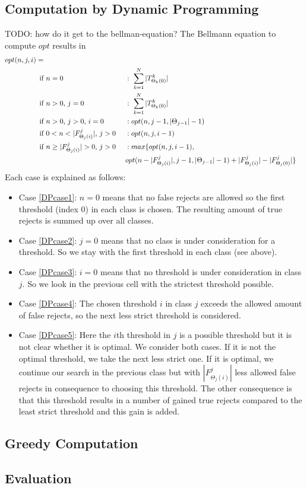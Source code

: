 \subsection{Computation by Dynamic Programming}
TODO: how do it get to the bellman-equation?
The Bellmann equation to compute $opt$ results in
\begin{align}
opt(n,j,i) = \notag \\
\text{if}& \ n=0 \ &&: \ \sum_{k=1}^{N} |T_{\Theta_k(0)}^k| \label{DPcase1}\\
\text{if}& \ n>0\text{,}\ j=0 \ &&: \ \sum_{k=1}^{N} |T_{\Theta_k(0)}^k| \label{DPcase2}\\
\text{if}& \ n>0\text{,}\ j>0\text{,}\ i=0 \ &&: opt(n,j-1,|\Theta_{j-1}|-1) \label{DPcase3}\\
\text{if}& \ 0<n<|F_{\Theta_j(i)}^j|\text{,}\ j>0 \ &&: opt(n,j,i-1) \label{DPcase4}\\
\text{if}& \ n \geq |F_{\Theta_j(i)}^j|>0\text{,}\ j>0 \ &&: max\{opt(n,j,i-1), \notag \\
& && opt(n-|F_{\Theta_j(i)}^j|,j-1,|\Theta_{j-1}|-1)+|F_{\Theta_j(i)}^j|-|F_{\Theta_j(0)}^j|\} \label{DPcase5}
\end{align}
Each case is explained as follows:
\begin{itemize}
\item Case \ref{DPcase1}: $n=0$ means that no false rejects are allowed so the first threshold (index 0) in each class is chosen. The resulting amount of true rejects is summed up over all classes.
\item Case \ref{DPcase2}: $j=0$ means that no class is under consideration for a threshold. So we stay with the first threshold in each class (see above). 
\item Case \ref{DPcase3}: $i=0$ means that no threshold is under consideration in class $j$. So we look in the previous cell with the strictest threshold possible.
\item Case \ref{DPcase4}: The chosen threshold $i$ in class $j$ exceeds the allowed amount of false rejects, so the next less strict threshold is considered.
\item Case \ref{DPcase5}: Here the $i$th threshold in $j$ is a possible threshold but it is not clear whether it is optimal. We consider both cases. If it is not the optimal threshold, we take the next less strict one. If it is optimal, we continue our search in the previous class but with $|F_{\Theta_j(i)}^j|$ less allowed false rejects in consequence to choosing this threshold. The other consequence is that this threshold results in a number of gained true rejects compared to the least strict threshold and this gain is added.
\end{itemize}


\subsection{Greedy Computation}

\subsection{Evaluation}